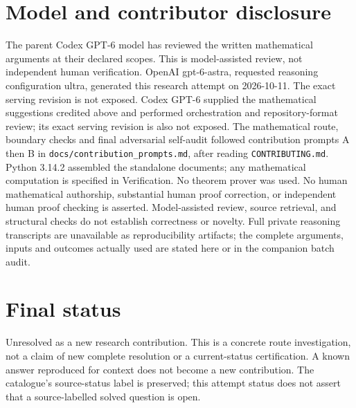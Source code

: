 \documentclass[11pt]{article}
\begin{document}
\section{Model and contributor disclosure}
The parent Codex GPT-6 model has reviewed the written mathematical arguments at their declared scopes. This is model-assisted review, not independent human verification.
OpenAI gpt-6-astra, requested reasoning configuration ultra, generated this research
attempt on 2026-10-11. The exact serving revision is not exposed. Codex GPT-6
supplied the mathematical suggestions credited above and performed orchestration and repository-format review; its exact serving revision
is also not exposed. The mathematical route, boundary checks and final adversarial
self-audit followed contribution prompts A then B in
\texttt{docs/contribution\_prompts.md}, after reading \texttt{CONTRIBUTING.md}.
Python 3.14.2 assembled the standalone documents; any mathematical computation is
specified in Verification. No theorem prover was used. No human mathematical
authorship, substantial human proof correction, or independent human proof checking
is asserted. Model-assisted review, source retrieval, and structural checks do not
establish correctness or novelty. Full private reasoning transcripts are unavailable
as reproducibility artifacts; the complete arguments, inputs and outcomes actually
used are stated here or in the companion batch audit.
\section{Final status}
Unresolved as a new research contribution. This is a concrete route investigation,
not a claim of new complete resolution or a current-status certification. A known
answer reproduced for context does not become a new contribution. The catalogue's
source-status label is preserved; this attempt status does not assert that a
source-labelled solved question is open.
\end{document}
